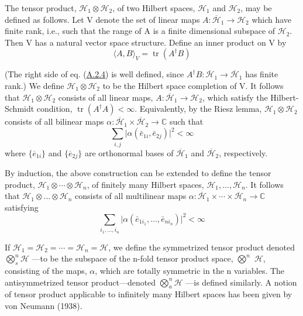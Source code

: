 \documentclass[11pt,a4paper]{article}
\begin{document}
The tensor product, \(\mathcal{H}_1 \otimes \mathcal{H}_2\), of two Hilbert spaces, \(\mathcal{H}_1\) and \(\mathcal{H}_2\), may be defined as follows. Let V denote the set of linear maps \(A:\overline{\mathcal{H}}_1 \rightarrow \mathcal{H}_2\) which have finite rank, i.e., such that the range of A is a finite dimensional subspace of \(\mathcal{H}_2\). Then V has a natural vector space structure. Define an inner product on V by
\begin{equation*}
\langle A,B\rangle_V = \operatorname{tr}(A^{\dagger}B) \tag{A.2.4}\label{eq:A.2.4}
\end{equation*}

(The right side of eq. (\hyperref[eq:A.2.4]{A.2.4}) is well defined, since \(A^{\dagger}B:\overline{\mathcal{H}}_{1}\to\overline{\mathcal{H}}_{1}\) has finite rank.) We define \(\mathcal{H}_{1}\otimes\mathcal{H}_{2}\) to be the Hilbert space completion of V. It follows that \(\mathcal{H}_{1}\otimes\mathcal{H}_{2}\) consists of all linear maps, \(A:\overline{\mathcal{H}}_{1}\to\mathcal{H}_{2}\), which satisfy the Hilbert-Schmidt condition, \(\operatorname{tr}(A^{\dagger}A)<\infty\). Equivalently, by the Riesz lemma, \(\mathcal{H}_{1}\otimes\mathcal{H}_{2}\) consists of all bilinear maps \(\alpha:\overline{\mathcal{H}}_{1}\times\overline{\mathcal{H}}_{2}\to\mathbb{C}\) such that
\begin{equation*}
\sum_{i,j}\lvert\alpha(\bar e_{1i},\bar e_{2j})\rvert^2<\infty \tag{A.2.5}\label{eq:A.2.5}
\end{equation*} \hypertarget{source-205}{} where \(\{\overline{e}_{1i}\}\) and \(\{\overline e_{2j}\}\) are orthonormal bases of \(\overline{\mathcal{H}}_1\) and \(\overline{\mathcal{H}}_2\), respectively.

By induction, the above construction can be extended to define the tensor product, \(\mathcal{H}_1 \otimes \cdots \otimes \mathcal{H}_n\), of finitely many Hilbert spaces, \(\mathcal{H}_1, ..., \mathcal{H}_n\). It follows that \(\mathcal{H}_1 \otimes ... \otimes \mathcal{H}_n\) consists of all multilinear maps \(\alpha: \overline{\mathcal{H}}_1 \times \cdots \times \overline{\mathcal{H}}_n \to \mathbb{C}\) satisfying
\begin{equation*}
\sum_{i_1,\ldots,i_n}\lvert\alpha(\bar e_{1i_1},\ldots,\bar e_{ni_n})\rvert^2<\infty \tag{A.2.6}\label{eq:A.2.6}
\end{equation*}

If \(\mathcal{H}_1 = \mathcal{H}_2 = \cdots = \mathcal{H}_n = \mathcal{H}\), we define the symmetrized tensor product denoted \(\bigotimes_s^n\mathcal H\) ---to be the subspace of the n-fold tensor product space, \(\bigotimes^{n}\) \(\mathcal{H}\), consisting of the maps, \(\alpha\), which are totally symmetric in the n variables. The antisymmetrized tensor product---denoted \(\bigotimes_a^n\mathcal H\) ---is defined similarly. A notion of tensor product applicable to infinitely many Hilbert spaces has been given by von Neumann (1938).
\end{document}
